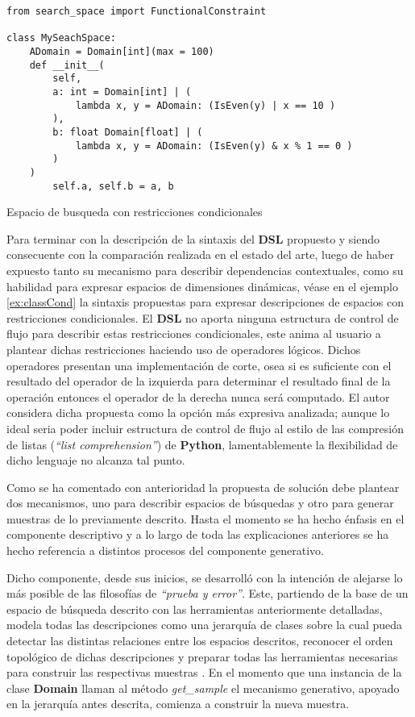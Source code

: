 \begin{listing}[!ht]
    \begin{verbatim}
from search_space import FunctionalConstraint

class MySeachSpace:
    ADomain = Domain[int](max = 100)
    def __init__(
        self, 
        a: int = Domain[int] | (
            lambda x, y = ADomain: (IsEven(y) | x == 10 )
        ),
        b: float Domain[float] | (
            lambda x, y = ADomain: (IsEven(y) & x % 1 == 0 )
        )             
    )
        self.a, self.b = a, b

    \end{verbatim}
    \caption{Espacio de busqueda con restricciones condicionales}
    \label{ex:classCond}
\end{listing}

Para terminar con la descripción de la sintaxis del {\bf DSL} propuesto y siendo consecuente con la comparación realizada
en el estado del arte, luego de haber expuesto tanto su mecanismo para describir dependencias contextuales, como su
habilidad para expresar espacios de dimensiones dinámicas, véase en el ejemplo \ref{ex:classCond} la sintaxis propuestas para
expresar descripciones de espacios con restricciones condicionales. El {\bf DSL} no aporta ninguna estructura de control
de flujo para describir estas restricciones condicionales, este anima al usuario a plantear dichas restricciones
haciendo uso de operadores lógicos. Dichos operadores presentan una implementación de corte, osea si es suficiente
con el resultado del operador de la izquierda para determinar el resultado final de la operación entonces el operador
de la derecha nunca será computado. El autor considera dicha propuesta como la opción más expresiva analizada; aunque
lo ideal seria poder incluir estructura de control de flujo al estilo de las compresión de listas  ({\it “list comprehension”})
de {\bf Python}, lamentablemente la flexibilidad de dicho lenguaje no alcanza tal punto.

Como se ha comentado con anterioridad la propuesta de solución debe plantear dos mecanismos, uno para describir espacios
de búsquedas y otro para generar muestras de lo previamente descrito. Hasta el momento se ha hecho énfasis en el componente
descriptivo y a lo largo de toda las explicaciones anteriores se ha hecho referencia a distintos procesos del componente generativo.

Dicho componente, desde sus inicios, se desarrolló con la intención de alejarse lo más posible de las filosofías de
    {\it “prueba y error”}. Este, partiendo de la base de un espacio de búsqueda descrito con las herramientas anteriormente
detalladas, modela todas las descripciones como una jerarquía de clases sobre la cual pueda detectar las distintas
relaciones entre los espacios descritos, reconocer el orden topológico de dichas descripciones y preparar todas las
herramientas necesarias para construir las respectivas muestras . En el momento que una instancia de la
clase {\bf Domain} llaman al método {\it get\_sample} el mecanismo generativo, apoyado en la jerarquía antes descrita, comienza
a construir la nueva muestra.

